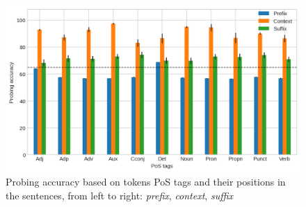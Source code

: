 \begin{figure}[ht]
\includegraphics[width=\columnwidth]{figures/probing-all.png}
\caption{Probing accuracy based on tokens PoS tags and their positions in the sentences, from left to right: \emph{prefix}, \emph{context}, \emph{suffix}   }\label{tab:res_per_PoS}
\end{figure}

